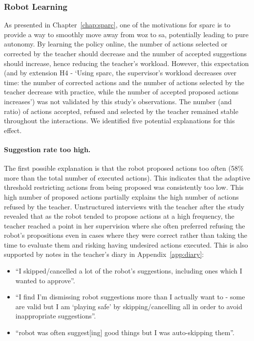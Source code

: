 \subsubsection{Robot Learning} \label{sec:tutoring_disc_learning}
%
%

As presented in Chapter~\ref{chap:sparc}, one of the motivations for \gls{sparc} is to provide a way to smoothly move away from \gls{woz} to \gls{sa}, potentially leading to pure autonomy. By learning the policy online, the number of actions selected or corrected by the teacher should decrease and the number of accepted suggestions should increase, hence reducing the teacher's workload. However, this expectation (and by extension H4 - `Using \gls{sparc}, the supervisor's workload decreases over time: the number of corrected actions and the number of actions selected  by the teacher decrease with practice, while the number of accepted proposed actions increases') was not validated by this study's observations. The number (and ratio) of actions accepted, refused and selected by the teacher remained stable throughout the interactions. We identified five potential explanations for this effect.

\paragraph{Suggestion rate too high.} \label{sec:tuto_rate}
The first possible explanation is that the robot proposed actions too often (58\% more than the total number of executed actions). This indicates that the adaptive threshold restricting actions from being proposed was consistently too low. This high number of proposed actions partially explains the high number of actions refused by the teacher. Unstructured interviews with the teacher after the study revealed that as the robot tended to propose actions at a high frequency, the teacher reached a point in her supervision where she often preferred refusing the robot's propositions even in cases where they were correct rather than taking the time to evaluate them and risking having undesired actions executed. This is also supported by notes in the teacher's diary in Appendix~\ref{app:diary}:
\begin{itemize}
	\item ``I skipped/cancelled a lot of the robot’s suggestions, including ones which I wanted to approve''.
	\item ``I find I’m dismissing robot suggestions more than I actually want to - some are valid but I am `playing safe' by skipping/cancelling all in order to avoid inappropriate suggestions''.
	\item ``robot was often suggest[ing] good things but I was auto-skipping them''.
\end{itemize}

